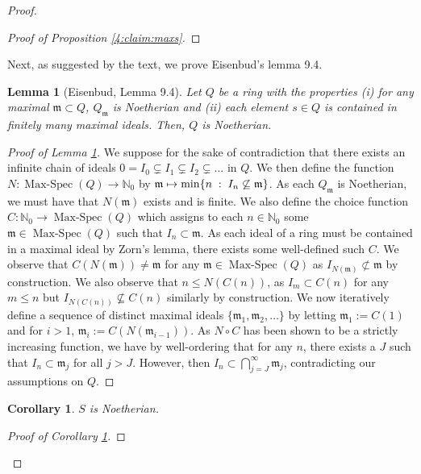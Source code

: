 \documentclass[Letter,12pt]{article}
\newcommand{\n}{\mathbb{N}}
\newcommand{\mfr}{\mathfrak{m}}
\newcommand{\<}{\left\langle}
\renewcommand{\>}{\right\rangle}
\DeclareMathOperator{\mspec}{Max-Spec}
\newenvironment{subproof}[1][\proofname]{%
	\renewcommand{\qedsymbol}{$\blacksquare$}%
	\begin{proof}[#1]%
	}{%
	\end{proof}%
}
\newtheorem{cor}[theorem]{Corollary}
\newtheorem{lemma}[theorem]{Lemma}
\theoremstyle{definition}
\begin{document}
\begin{proof}
\begin{subproof}[Proof of Proposition \ref{4:claim:maxs}]
		\end{subproof}
		Next, as suggested by the text, we prove Eisenbud's lemma 9.4.
		\begin{lemma}[Eisenbud, Lemma 9.4]\label{4:lem:9.4}
			Let $Q$ be a ring with the properties (i) for any maximal $\mfr\subset Q$, $Q_\mfr$ is Noetherian and (ii) each element $s\in Q$ is contained in finitely many maximal ideals. Then, $Q$ is Noetherian.
		\end{lemma}
		\begin{subproof}[Proof of Lemma \ref{4:lem:9.4}]
			We suppose for the sake of contradiction that there exists an infinite chain of ideals $0=I_0\subsetneq I_1\subsetneq I_2\subsetneq\ldots$ in $Q$. We then define the function $N:\mspec(Q)\to \n_0$ by $\mfr\mapsto \min\{n\;:\; I_n\centernot \subseteq\mfr\}$. As each $Q_\mfr$ is Noetherian, we must have that $N(\mfr)$ exists and is finite. We also define the choice function $C:\n_0\to \mspec(Q)$ which assigns to each $n\in \n_0$ some $\mfr\in \mspec(Q)$ such that $I_n\subset \mfr$. As each ideal of a ring must be contained in a maximal ideal by Zorn's lemma, there exists some well-defined such $C$. We observe that $C(N(\mfr))\neq \mfr$ for any $\mfr\in \mspec(Q)$ as $I_{N(\mfr)}\not \subset \mfr$ by construction. We also observe that $n\leq N(C(n))$, as $I_m\subset C(n)$ for any $m\leq n$ but $I_{N(C(n))}\not\subseteq C(n)$ similarly by construction. We now iteratively define a sequence of distinct maximal ideals $\{\mfr_1,\mfr_2,\hdots\}$ by letting $\mfr_1:=C(1)$ and for $i>1$, $\mfr_i:=C(N(\mfr_{i-1}))$. As $N\circ C$ has been shown to be a strictly increasing function, we have by well-ordering that for any $n$, there exists a $J$ such that $I_n\subset \mfr_j$ for all $j>J$. However, then $I_n\subset \bigcap_{j=J}^\infty \mfr_j$, contradicting our assumptions on $Q$.
		\end{subproof}
		\begin{cor}
			\label{4:cor:Noe}$S$ is Noetherian.
		\end{cor}
		\begin{subproof}[Proof of Corollary \ref{4:cor:Noe}]

\end{subproof}
\end{proof}
\end{document}
